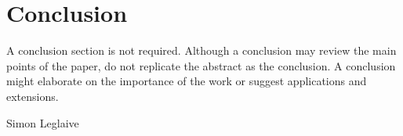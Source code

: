 \documentclass{ifacconf}  %
\begin{document}



\section{Conclusion}

A conclusion section is not required. Although a conclusion may review
the main points of the paper, do not replicate the abstract as the
conclusion. A conclusion might elaborate on the importance of the work
or suggest applications and extensions.
\begin{ack}
Simon Leglaive
\end{ack}


\end{document}
